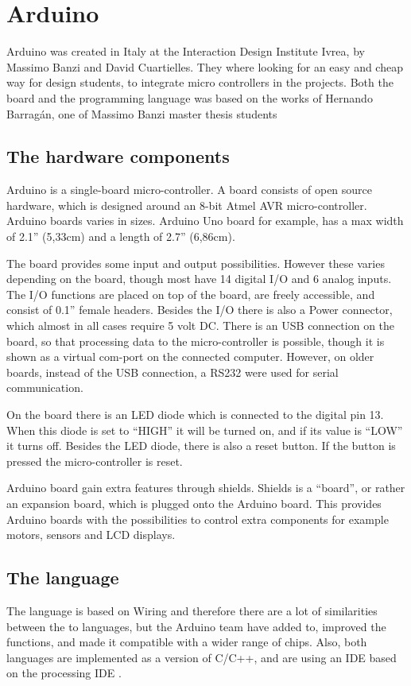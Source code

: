 \chapter{Arduino}\label{analysis:arduino}
Arduino was created in Italy at the Interaction Design Institute Ivrea, by Massimo Banzi and David Cuartielles. They where looking for an easy and cheap way for design students, to integrate micro controllers in the projects\cite{arduino:hist}. Both the board and the programming language was based on the works of Hernando Barragán, one of Massimo Banzi master thesis students \cite{Wiring:thesis}

\section{The hardware components}
Arduino is a single-board micro-controller.
A board consists of open source hardware, which is designed around an 8-bit Atmel AVR micro-controller. Arduino boards varies in sizes. Arduino Uno board for example, has a max width of 2.1'' (5,33cm) and a length of 2.7'' (6,86cm). 

The board provides some input and output possibilities. However these varies depending on the board, though most have 14 digital I/O and 6 analog inputs. The I/O functions are placed on top of the board, are freely accessible, and consist of 0.1'' female headers. Besides the I/O there is also a Power connector, which almost in all cases require 5 volt DC. There is an USB connection on the board, so that processing data to the micro-controller is possible, though it is shown as a virtual com-port on the connected computer. However, on older boards, instead of the USB connection, a RS232 were used for serial communication. 

On the board there is an LED diode which is connected to the digital pin 13. When this diode is set to ``HIGH'' it will be turned on, and if its value is ``LOW'' it turns off. Besides the LED diode, there is also a reset button. If the button is pressed the micro-controller is reset. 

Arduino board gain extra features through shields. Shields is a ``board'', or rather an expansion board, which is plugged onto the Arduino board. This provides Arduino boards with the possibilities to control extra components for example motors, sensors and LCD displays.

\section{The language}
The language is based on Wiring and therefore there are a lot of similarities between the to languages, but the Arduino team have added to, improved the functions, and made it compatible with a wider range of chips. Also, both languages are implemented as a  version of C/C++, and are using an IDE based on the processing IDE \cite{Wiring:thesis}\cite{Arduino:IDE}.\\

